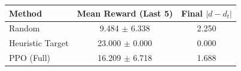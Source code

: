 \begin{tabular}{lcc}
\toprule
Method & Mean Reward (Last 5) & Final $|d-d_t|$ \\
\midrule
Random & 9.484 $\pm$ 6.338 & 2.250 \\
Heuristic Target & 23.000 $\pm$ 0.000 & 0.000 \\
PPO (Full) & 16.209 $\pm$ 6.718 & 1.688 \\
\bottomrule
\end{tabular}
